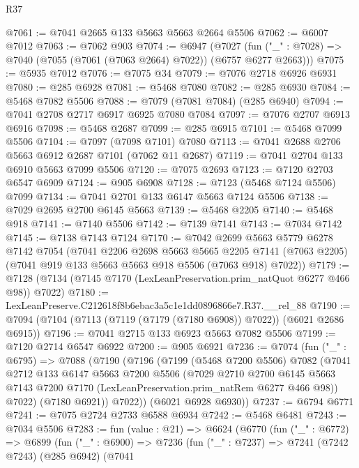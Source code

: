 \begin{lexlean}{R37}
\begin{coremodule}
@7061 := @7041 @2665 @133 @5663 @5663 @2664 @5506
@7062 := @6007 @7012
@7063 := @7062 @903
@7074 := @6947
    (@7027 (fun ("_" : @7028) => @7040 (@7055 (@7061 (@7063 @2664) @7022)) (@6757 @6277 @2663)))
@7075 := @5935 @7012
@7076 := @7075 @34
@7079 := @7076 @2718 @6926 @6931
@7080 := @285 @6928
@7081 := @5468 @7080
@7082 := @285 @6930
@7084 := @5468 @7082 @5506
@7088 := @7079 (@7081 @7084) (@285 @6940)
@7094 := @7041 @2708 @2717 @6917 @6925 @7080 @7084
@7097 := @7076 @2707 @6913 @6916
@7098 := @5468 @2687
@7099 := @285 @6915
@7101 := @5468 @7099 @5506
@7104 := @7097 (@7098 @7101) @7080
@7113 := @7041 @2688 @2706 @5663 @6912 @2687 @7101 (@7062 @11 @2687)
@7119 := @7041 @2704 @133 @6910 @5663 @7099 @5506
@7120 := @7075 @2693
@7123 := @7120 @2703 @6547 @6909
@7124 := @905 @6908
@7128 := @7123 (@5468 @7124 @5506) @7099
@7134 := @7041 @2701 @133 @6147 @5663 @7124 @5506
@7138 := @7029 @2695 @2700 @6145 @5663
@7139 := @5468 @2205
@7140 := @5468 @918
@7141 := @7140 @5506
@7142 := @7139 @7141
@7143 := @7034 @7142
@7145 := @7138 @7143 @7124
@7170 := @7042
    @2699
    @5663
    @5779
    @6278
    @7142
    @7054
    (@7041
      @2206
      @2698
      @5663
      @5665
      @2205
      @7141
      (@7063 @2205)
      (@7041 @919 @133 @5663 @5663 @918 @5506 (@7063 @918) @7022))
@7179 := @7128 (@7134 (@7145 @7170 (LexLeanPreservation.prim_natQuot @6277 @466 @98)) @7022)
@7180 := LexLeanPreserve.C212618f8b6ebac3a5c1e1dd0896866e7.R37.__rel_88
@7190 := @7094 (@7104 (@7113 (@7119 (@7179 (@7180 @6908)) @7022)) (@6021 @2686 @6915))
@7196 := @7041 @2715 @133 @6923 @5663 @7082 @5506
@7199 := @7120 @2714 @6547 @6922
@7200 := @905 @6921
@7236 := @7074
    (fun ("_" : @6795) =>
    @7088
      (@7190
        (@7196
          (@7199
            (@5468 @7200 @5506)
            @7082
            (@7041
              @2712
              @133
              @6147
              @5663
              @7200
              @5506
              (@7029
                @2710
                @2700
                @6145
                @5663
                @7143
                @7200
                @7170
                (LexLeanPreservation.prim_natRem @6277 @466 @98))
              @7022)
            (@7180 @6921))
          @7022))
      (@6021 @6928 @6930))
@7237 := @6794 @6771
@7241 := @7075 @2724 @2733 @6588 @6934
@7242 := @5468 @6481
@7243 := @7034 @5506
@7283 := fun (value : @21) =>
  @6624
    (@6770
      (fun ("_" : @6772) =>
      @6899
        (fun ("_" : @6900) =>
        @7236
          (fun ("_" : @7237) =>
          @7241
            (@7242 @7243)
            (@285 @6942)
            (@7041

\end{coremodule}
\end{lexlean}
